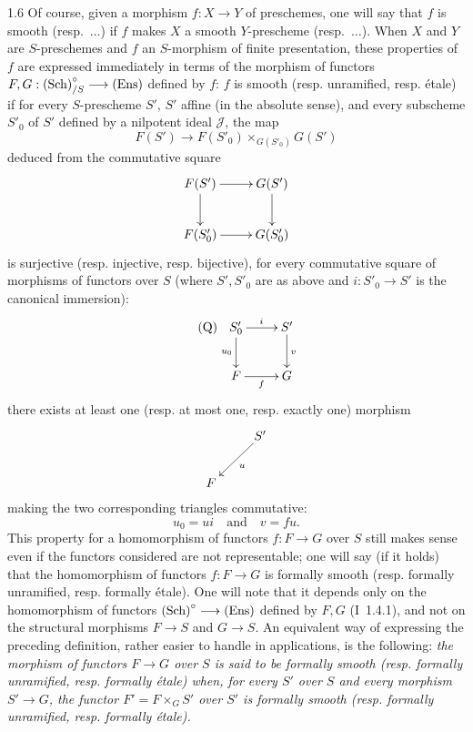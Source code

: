 \begin{remark}{1.6}\label{XI.1.6}
Of course, given a morphism $f:X\to Y$ of preschemes, one will say that $f$ is smooth (resp.\ $\ldots$) if $f$ makes $X$ a smooth $Y$-prescheme (resp.\ $\ldots$). When $X$ and $Y$ are $S$-preschemes and $f$ an $S$-morphism of finite presentation, these properties of $f$ are expressed immediately in terms of the morphism of functors $F,G:\textup{(Sch)}^\circ_{/S}\longrightarrow\textup{(Ens)}$ defined by $f$: $f$ is smooth (resp. unramified, resp. étale) if for every $S$-prescheme $S'$, $S'$ affine (in the absolute sense), and every subscheme $S'_0$ of $S'$ defined by a nilpotent ideal $\mathscr J$, the map
\[
F(S')\to F(S'_0)\times_{G(S'_0)}G(S')
\]
deduced from the commutative square
\[
\xymatrix{F(S')\ar[r]\ar[d]&G(S')\ar[d]\\F(S'_0)\ar[r]&G(S'_0)}
\]
is surjective (resp. injective, resp. bijective), \ie for every commutative square of morphisms of functors over $S$ (where $S',S'_0$ are as above and $i:S'_0\to S'$ is the canonical immersion):
\begin{equation}\tag{Q}
\xymatrix{S'_0\ar[r]^i\ar[d]_{u_0}&S'\ar[d]^v\\F\ar[r]_f&G}
\end{equation}
there exists at least one (resp. at most one, resp. exactly one) morphism
\[
\xymatrix{&S'\ar[dl]^u\\F&}
\]
making the two corresponding triangles commutative:
\[
u_0=ui\quad\text{and}\quad v=fu.
\]
This property for a homomorphism of functors $f:F\to G$ over $S$ still makes sense even if the functors considered are not representable; one will say (if it holds) that the homomorphism of functors $f:F\to G$ is formally smooth (resp. formally unramified, resp. formally étale). One will note that it depends only on the homomorphism of functors $\textup{(Sch)}^\circ\longrightarrow\textup{(Ens)}$ defined by $F,G$ (\cf I~1.4.1), and not on the structural morphisms $F\to S$ and $G\to S$. An equivalent way of expressing the preceding definition, rather easier to handle in applications, is the following: \emph{the morphism of functors $F\to G$ over $S$ is said to be formally smooth (resp. formally unramified, resp. formally étale) when, for every $S'$ over $S$ and every morphism $S'\to G$, the functor $F'=F\times_G S'$ over $S'$ is formally smooth (resp. formally unramified, resp. formally étale).}
\end{remark}

